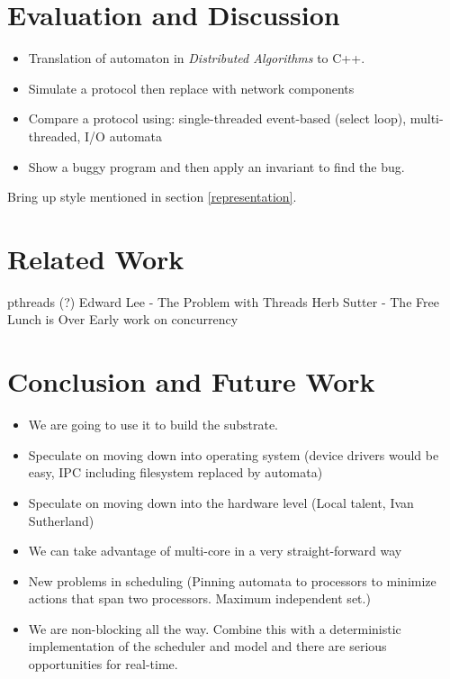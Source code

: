 \documentclass[letterpaper]{article}
\begin{document}
\section{Evaluation and Discussion\label{evaluation}}

\begin{itemize}
\item Translation of automaton in \emph{Distributed Algorithms} to C++.
\item Simulate a protocol then replace with network components
\item Compare a protocol using: single-threaded event-based (select loop), multi-threaded, I/O automata
\item Show a buggy program and then apply an invariant to find the bug.
\end{itemize}

Bring up style mentioned in section \ref{representation}.

\section{Related Work\label{related_work}}

pthreads (?)
Edward Lee - The Problem with Threads
Herb Sutter - The Free Lunch is Over
Early work on concurrency

\section{Conclusion and Future Work\label{conclusion}}

\begin{itemize}
  \item We are going to use it to build the substrate.
  \item Speculate on moving down into operating system (device drivers would be easy, IPC including filesystem replaced by automata)
  \item Speculate on moving down into the hardware level (Local talent, Ivan Sutherland)
  \item We can take advantage of multi-core in a very straight-forward way
  \item New problems in scheduling (Pinning automata to processors to minimize actions that span two processors.  Maximum independent set.)
  \item We are non-blocking all the way.  Combine this with a deterministic implementation of the scheduler and model and there are serious opportunities for real-time.
\end{itemize}
\end{document}
